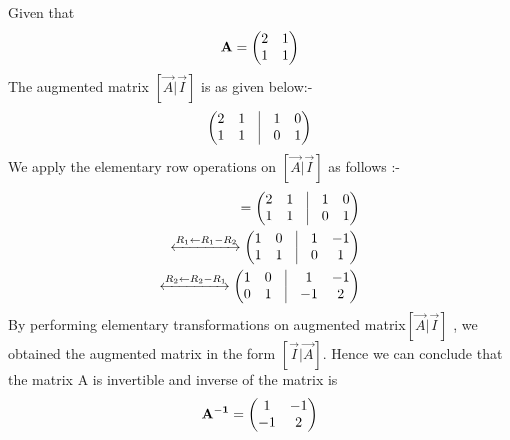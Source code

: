
Given that
\begin{align}
\mathbf{A} = \begin{pmatrix} 2 & 1 \\ 1 & 1\end{pmatrix}
\end{align}
The augmented matrix $ [\vec{A} | \vec{I}]$ is as given below:- 
\begin{align}
\myvec{2 & 1 & \vrule & 1 & 0 \\ 1 & 1 & \vrule & 0 & 1}
\end{align}
We apply the elementary row operations on $ [\vec{A} | \vec{I}]$ as follows :-
\begin{align}
[\vec{A} | \vec{I}] = \myvec{2 & 1 & \vrule & 1 & 0 \\ 1 & 1 & \vrule & 0 & 1}
\\
\xleftrightarrow{R_1\leftarrow R_1-R_2}   
\myvec{1 & 0 & \vrule & 1 & -1 \\ 1 & 1 & \vrule & 0 & 1}
\\
\xleftrightarrow{R_2\leftarrow R_2-R_1}
\myvec{1 & 0 & \vrule & 1 & -1 \\ 0 & 1 & \vrule & -1 & 2}
\end{align}
By performing elementary transformations on augmented matrix$ [\vec{A} | \vec{I}]$ , we obtained the augmented matrix in the form $ [\vec{I} | \vec{A}]$. 
Hence we can conclude that the matrix A is invertible and inverse of the matrix is
\begin{align}
\mathbf{A^{-1}}=\begin{pmatrix} 1 & -1 \\  -1 & 2\end{pmatrix} 
\end{align}
